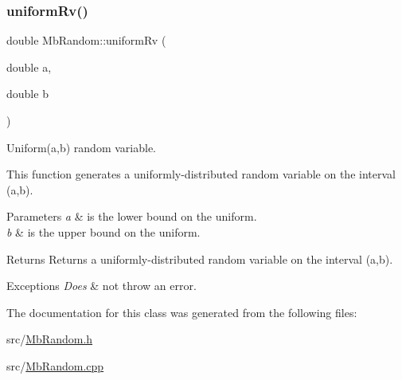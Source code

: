\subsubsection{\texorpdfstring{uniformRv()}{uniformRv()}\hspace{0.1cm}{\footnotesize\ttfamily [2/2]}}
{\footnotesize\ttfamily double Mb\+Random\+::uniform\+Rv (\begin{DoxyParamCaption}\item[{double}]{a,  }\item[{double}]{b }\end{DoxyParamCaption})\hspace{0.3cm}{\ttfamily [inline]}}



Uniform(a,b) random variable. 

This function generates a uniformly-\/distributed random variable on the interval (a,b).


\begin{DoxyParams}{Parameters}
{\em a} & is the lower bound on the uniform. \\
\hline
{\em b} & is the upper bound on the uniform. \\
\hline
\end{DoxyParams}
\begin{DoxyReturn}{Returns}
Returns a uniformly-\/distributed random variable on the interval (a,b). 
\end{DoxyReturn}

\begin{DoxyExceptions}{Exceptions}
{\em Does} & not throw an error. \\
\hline
\end{DoxyExceptions}


The documentation for this class was generated from the following files\+:\begin{DoxyCompactItemize}
\item 
src/\mbox{\hyperlink{_mb_random_8h}{Mb\+Random.\+h}}\item 
src/\mbox{\hyperlink{_mb_random_8cpp}{Mb\+Random.\+cpp}}\end{DoxyCompactItemize}
